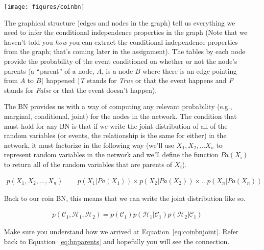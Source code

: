 \documentclass[assignment02_Solutions]{subfiles}
\begin{document}
\begin{center}
\texttt{[image: figures/coinbn]}
\end{center}

The graphical structure (edges and nodes in the graph) tell us everything we need to infer the conditional independence properties in the graph (Note that we haven't told you \emph{how} you can extract the conditional independence properties from the graph; that's coming later in the assignment).  The tables by each node provide the probability of the event conditioned on whether or not the node's parents (a ``parent'' of a node, $A$, is a node $B$ where there is an edge pointing from $A$ to $B$) happened (\emph{T} stands for \emph{True} or that the event happens and \emph{F} stands for \emph{False} or that the event doesn't happen).

The BN provides us with a way of computing any relevant probability (e.g., marginal, conditional, joint) for the nodes in the network.  The condition that must hold for any BN is that if we write the joint distribution of all of the random variables (or events, the relationship is the same for either) in the network, it must factorize in the following way (we'll use $X_1, X_2, \ldots X_n$ to represent random variables in the network and we'll define the function $Pa(X_i)$ to return all of the random variables that are parents of $X_i$).

\begin{align}
p(X_1, X_2, \ldots, X_n) &= p(X_1 | Pa(X_1)) \times p(X_2 | Pa(X_2)) \times \ldots p(X_n | Pa(X_n)) \label{eq:bnparents}
\end{align}

Back to our coin BN, this means that we can write the joint distribution like so.

\begin{align}
p(\mathcal{C}_1, \mathcal{H}_1, \mathcal{H}_2) = p(\mathcal{C}_1) p(\mathcal{H}_1 | \mathcal{C}_1) p(\mathcal{H}_2 | \mathcal{C}_1) \label{eq:coinbnjoint}
\end{align}

\begin{understandingcheck}
Make sure you understand how we arrived at Equation~\ref{eq:coinbnjoint}.  Refer back to Equation~\ref{eq:bnparents} and hopefully you will see the connection.
\end{understandingcheck}
\end{document}
